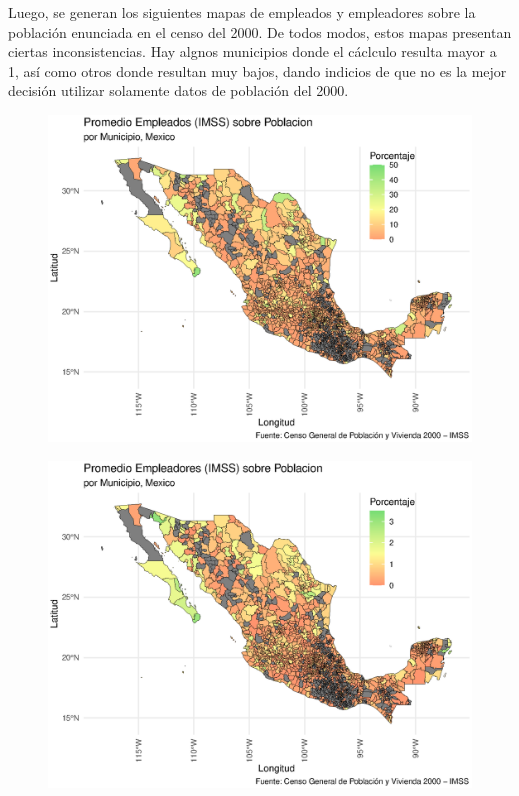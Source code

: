 \documentclass[9pt]{article}
\begin{document}
\newpage
Luego, se generan los siguientes mapas de empleados y empleadores sobre la poblaci\'on enunciada en el censo del 2000. De todos modos, estos mapas presentan ciertas inconsistencias. Hay algnos municipios donde el c\'aclculo resulta mayor a 1, as\'i como otros donde resultan muy bajos, dando indicios de que no es la mejor decisi\'on utilizar solamente datos de poblaci\'on del 2000.
 \begin{figure}[H]
     \centering
     \includegraphics[width=\textwidth]{figs/employeespob.eps}
 \end{figure}
  \begin{figure}[H]
     \centering
     \includegraphics[width=\textwidth]{figs/employerspob.eps}
 \end{figure}
\printbibliography 
\end{document}
